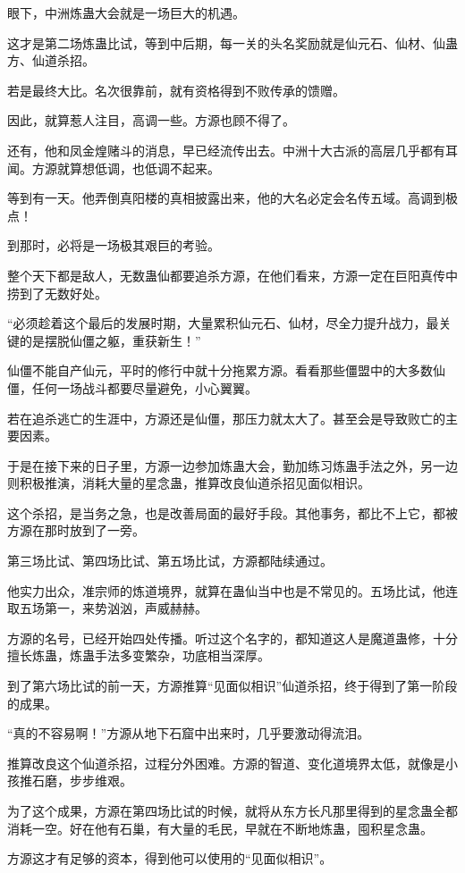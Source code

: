 \begin{this_body}
眼下，中洲炼蛊大会就是一场巨大的机遇。

这才是第二场炼蛊比试，等到中后期，每一关的头名奖励就是仙元石、仙材、仙蛊方、仙道杀招。

若是最终大比。名次很靠前，就有资格得到不败传承的馈赠。

因此，就算惹人注目，高调一些。方源也顾不得了。

还有，他和凤金煌赌斗的消息，早已经流传出去。中洲十大古派的高层几乎都有耳闻。方源就算想低调，也低调不起来。

等到有一天。他弄倒真阳楼的真相披露出来，他的大名必定会名传五域。高调到极点！

到那时，必将是一场极其艰巨的考验。

整个天下都是敌人，无数蛊仙都要追杀方源，在他们看来，方源一定在巨阳真传中捞到了无数好处。

“必须趁着这个最后的发展时期，大量累积仙元石、仙材，尽全力提升战力，最关键的是摆脱仙僵之躯，重获新生！”

仙僵不能自产仙元，平时的修行中就十分拖累方源。看看那些僵盟中的大多数仙僵，任何一场战斗都要尽量避免，小心翼翼。

若在追杀逃亡的生涯中，方源还是仙僵，那压力就太大了。甚至会是导致败亡的主要因素。

于是在接下来的日子里，方源一边参加炼蛊大会，勤加练习炼蛊手法之外，另一边则积极推演，消耗大量的星念蛊，推算改良仙道杀招见面似相识。

这个杀招，是当务之急，也是改善局面的最好手段。其他事务，都比不上它，都被方源在那时放到了一旁。

第三场比试、第四场比试、第五场比试，方源都陆续通过。

他实力出众，准宗师的炼道境界，就算在蛊仙当中也是不常见的。五场比试，他连取五场第一，来势汹汹，声威赫赫。

方源的名号，已经开始四处传播。听过这个名字的，都知道这人是魔道蛊修，十分擅长炼蛊，炼蛊手法多变繁杂，功底相当深厚。

到了第六场比试的前一天，方源推算“见面似相识”仙道杀招，终于得到了第一阶段的成果。

“真的不容易啊！”方源从地下石窟中出来时，几乎要激动得流泪。

推算改良这个仙道杀招，过程分外困难。方源的智道、变化道境界太低，就像是小孩推石磨，步步维艰。

为了这个成果，方源在第四场比试的时候，就将从东方长凡那里得到的星念蛊全都消耗一空。好在他有石巢，有大量的毛民，早就在不断地炼蛊，囤积星念蛊。

方源这才有足够的资本，得到他可以使用的“见面似相识”。


\end{this_body}

